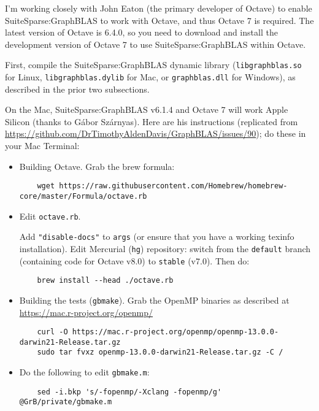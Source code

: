 \documentclass[12pt]{article}
\begin{document}
I'm working closely with John Eaton (the primary developer of Octave) to
enable SuiteSparse:GraphBLAS to work with Octave, and thus Octave 7 is
required.  The latest version of Octave is 6.4.0, so you need to download and
install the development version of Octave 7 to use SuiteSparse:GraphBLAS within
Octave.

First, compile the SuiteSparse:GraphBLAS dynamic library
(\verb'libgraphblas.so' for Linux, \verb'libgraphblas.dylib' for Mac,
or \verb'graphblas.dll' for Windows), as described in the prior two
subsections.

On the Mac, SuiteSparse:GraphBLAS v6.1.4 and Octave 7 will work 
Apple Silicon (thanks to G{\'{a}}bor Sz{\'{a}}rnyas).  Here are his instructions
(replicated from
\url{https://github.com/DrTimothyAldenDavis/GraphBLAS/issues/90}); do
these in your Mac Terminal:

\begin{itemize}
\item Building Octave.  Grab the brew formula:

    {\scriptsize
    \begin{verbatim}
    wget https://raw.githubusercontent.com/Homebrew/homebrew-core/master/Formula/octave.rb
    \end{verbatim} }

\item Edit \verb'octave.rb'.

   Add \verb`"disable-docs"` to \verb`args` (or ensure that you have a working
   texinfo installation).
   Edit Mercurial (\verb`hg`) repository: switch from the \verb`default` branch
   (containing code for Octave v8.0) to \verb`stable` (v7.0).  Then do:

    {\small
    \begin{verbatim}
    brew install --head ./octave.rb
    \end{verbatim} }

\item Building the tests (\verb'gbmake').
    Grab the OpenMP binaries as described at
    \url{https://mac.r-project.org/openmp/}

    {\scriptsize
    \begin{verbatim}
    curl -O https://mac.r-project.org/openmp/openmp-13.0.0-darwin21-Release.tar.gz
    sudo tar fvxz openmp-13.0.0-darwin21-Release.tar.gz -C /
    \end{verbatim} }

\item Do the following to edit \verb'gbmake.m':

    {\scriptsize
    \begin{verbatim}
    sed -i.bkp 's/-fopenmp/-Xclang -fopenmp/g' @GrB/private/gbmake.m
    \end{verbatim} }

\end{itemize}
\end{document}
